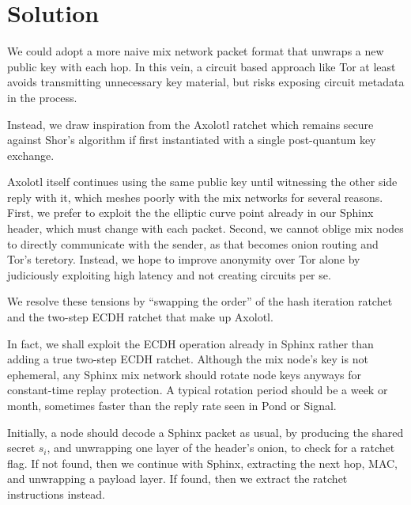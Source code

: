 \documentclass[twoside,letterpaper]{sig-alternate}
\begin{document}
\section{Solution}

We could adopt a more naive mix network packet format that unwraps
a new public key with each hop.  In this vein, a circuit based approach
like Tor at least avoids transmitting unnecessary key material, but
risks exposing circuit metadata in the process. 

Instead, we draw inspiration from the Axolotl ratchet %
which remains secure against Shor's algorithm if
 first instantiated with a single post-quantum key exchange. 

Axolotl itself continues using the same public key until witnessing
 the other side reply with it, which meshes poorly with the mix networks
for several reasons.
%
First, we prefer to exploit the the elliptic curve point
 already in our Sphinx header, which must change with each packet.
%
Second, we cannot oblige mix nodes to directly communicate with
 the sender, as that becomes onion routing and Tor's teretory.
%
Instead, we hope to improve anonymity over Tor alone by
 judiciously exploiting high latency and not creating circuits per se.

We resolve these tensions by ``swapping the order'' of the hash iteration
ratchet and the two-step ECDH ratchet that make up Axolotl.  

In fact, we shall exploit the ECDH operation already in Sphinx rather
 than adding a true two-step ECDH ratchet.
Although the mix node's key is not ephemeral, any Sphinx mix network
should rotate node keys anyways for constant-time replay protection.
A typical rotation period should be a week or month, sometimes
 faster than the reply rate seen in Pond or Signal.

\smallskip


\def\cn{\textrm{cn}}
\def\ck{\textrm{ck}}
\def\DH{\textrm{DH}}
\def\lk{\textrm{lk}}
\def\mk{\textrm{mk}}
\def\sk{\textrm{sk}}
\def\ECDH{\textrm{ECDH}}

Initially, a node should decode a Sphinx packet as usual, 
by producing the shared secret $s_i$, and 
unwrapping one layer of the header's onion,
 to check for a ratchet flag. 
If not found, then we continue with Sphinx, 
 extracting the next hop, MAC, and unwrapping a payload layer.
If found, then we extract the ratchet instructions instead.
\end{document}
